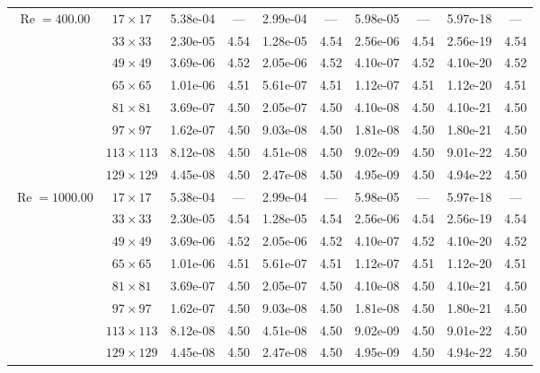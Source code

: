 \documentclass[preprint, 12pt]{elsarticle}
\begin{document}
\begin{center}
\begin{table}[H]
{\begin{tabular*}{\textwidth}{@{\extracolsep\fill}cccccccccc@{}}
    \hline
    \multirow{7}{*}{$\operatorname{Re}=400.00$} & $17\times 17$ & 5.38e-04 & --- & 2.99e-04 & --- & 5.98e-05 & --- & 5.97e-18 & --- \\
    & $33\times 33$ & 2.30e-05 & 4.54 & 1.28e-05 & 4.54 & 2.56e-06 & 4.54 & 2.56e-19 & 4.54 \\
    & $49\times 49$ & 3.69e-06 & 4.52 & 2.05e-06 & 4.52 & 4.10e-07 & 4.52 & 4.10e-20 & 4.52 \\
    \multirow{3}{*}{$\operatorname{Wi}=10$} & $65\times 65$ & 1.01e-06 & 4.51 & 5.61e-07 & 4.51 & 1.12e-07 & 4.51 & 1.12e-20 & 4.51 \\
    & $81\times 81$ & 3.69e-07 & 4.50 & 2.05e-07 & 4.50 & 4.10e-08 & 4.50 & 4.10e-21 & 4.50 \\
    & $97\times 97$ & 1.62e-07 & 4.50 & 9.03e-08 & 4.50 & 1.81e-08 & 4.50 & 1.80e-21 & 4.50 \\
    & $113\times 113$ & 8.12e-08 & 4.50 & 4.51e-08 & 4.50 & 9.02e-09 & 4.50 & 9.01e-22 & 4.50 \\
    & $129\times 129$ & 4.45e-08 & 4.50 & 2.47e-08 & 4.50 & 4.95e-09 & 4.50 & 4.94e-22 & 4.50 \\
    \hline
    \multirow{7}{*}{$\operatorname{Re}=1000.00$} & $17\times 17$ & 5.38e-04 & --- & 2.99e-04 & --- & 5.98e-05 & --- & 5.97e-18 & --- \\
    & $33\times 33$ & 2.30e-05 & 4.54 & 1.28e-05 & 4.54 & 2.56e-06 & 4.54 & 2.56e-19 & 4.54 \\
    & $49\times 49$ & 3.69e-06 & 4.52 & 2.05e-06 & 4.52 & 4.10e-07 & 4.52 & 4.10e-20 & 4.52 \\
    \multirow{3}{*}{$\operatorname{Wi}=10$} & $65\times 65$ & 1.01e-06 & 4.51 & 5.61e-07 & 4.51 & 1.12e-07 & 4.51 & 1.12e-20 & 4.51 \\
    & $81\times 81$ & 3.69e-07 & 4.50 & 2.05e-07 & 4.50 & 4.10e-08 & 4.50 & 4.10e-21 & 4.50 \\
    & $97\times 97$ & 1.62e-07 & 4.50 & 9.03e-08 & 4.50 & 1.81e-08 & 4.50 & 1.80e-21 & 4.50 \\
    & $113\times 113$ & 8.12e-08 & 4.50 & 4.51e-08 & 4.50 & 9.02e-09 & 4.50 & 9.01e-22 & 4.50 \\
    & $129\times 129$ & 4.45e-08 & 4.50 & 2.47e-08 & 4.50 & 4.95e-09 & 4.50 & 4.94e-22 & 4.50 \\
    \hline
    \end{tabular*}
}
\end{table}
\end{center}
\end{document}
